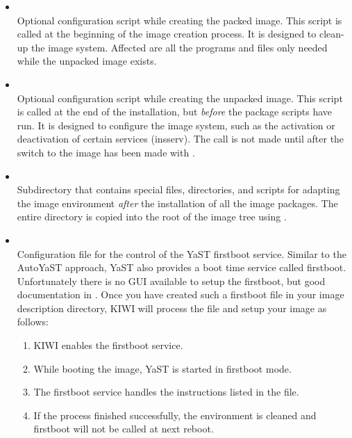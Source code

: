 \begin{itemize}
\item {}\\
      Optional configuration script while creating the packed image.
      This script is called at the beginning of the image creation process.
      It is designed to clean-up the image system. Affected are all the
      programs and files only needed while the unpacked image exists.

\item {}\\
      Optional configuration script while creating the unpacked image. This
      script is called at the end of the installation, but \emph{before}
      the package scripts have run. It is designed to configure the image
      system, such as the activation or deactivation of certain services
      (insserv). The call is not made until after the switch to the image
      has been made with .

\item {}\\
      Subdirectory that contains special files, directories, and scripts for
      adapting the image environment \emph{after} the installation of all the
      image packages. The entire directory is copied into the root of the
      image tree using  .

\item {}\\
      Configuration file for the control of the YaST firstboot service.
      Similar to the AutoYaST approach, YaST also provides a boot time
      service called firstboot. Unfortunately there is no GUI available
      to setup the firstboot, but good documentation in
      . Once you have 
      created such a firstboot file in your image description directory, KIWI
      will process the file and setup your image as follows:

      \begin{enumerate}
      \item KIWI enables the firstboot service.
      \item While booting the image, YaST is started in firstboot mode.
      \item The firstboot service handles the instructions listed in the
            file\linebreak {}.
      \item If the process finished successfully, the environment is
            cleaned and firstboot will not be called at next reboot.
      \end{enumerate}


\end{itemize}

